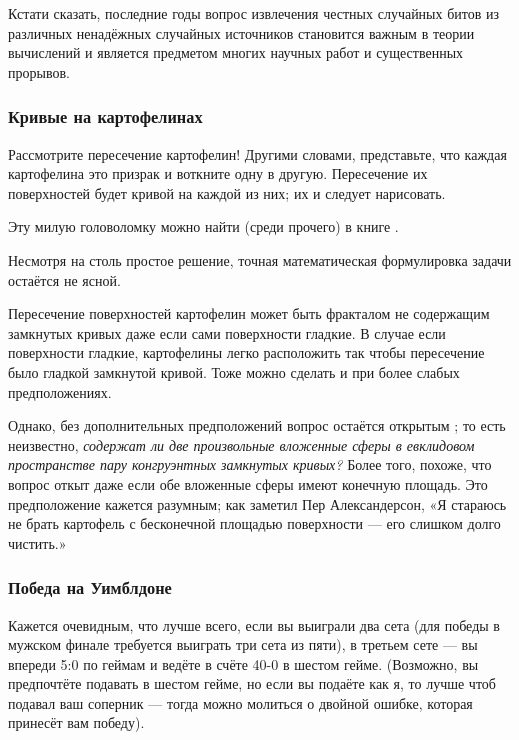 Кстати сказать, последние годы вопрос извлечения честных %
случайных битов из различных ненадёжных случайных источников становится важным в теории вычислений и является предметом многих научных работ и существенных прорывов.

\subsubsection*{Кривые на картофелинах}

Рассмотрите пересечение картофелин!
Другими словами, представьте, что каждая картофелина это призрак и воткните одну в другую.
Пересечение их поверхностей будет кривой на каждой из них; их и следует нарисовать.

Эту милую головоломку можно найти (среди прочего) в книге \cite{berlekamp-rodgers}.

\begin{addedbytheeditors}
Несмотря на столь простое решение, точная математическая формулировка задачи остаётся не ясной.

Пересечение поверхностей картофелин может быть фракталом не содержащим замкнутых кривых даже если сами поверхности гладкие.
В случае если поверхности гладкие, картофелины легко расположить так чтобы пересечение было гладкой замкнутой кривой.
Тоже можно сделать и при более слабых предположениях.

Однако, без дополнительных предположений вопрос остаётся открытым \cite{agol};
то есть неизвестно, \emph{содержат ли две произвольные вложенные сферы в евклидовом пространстве пару конгруэнтных замкнутых кривых?} 
Более того, похоже, что вопрос откыт даже если обе вложенные сферы имеют конечную площадь.
Это предположение кажется разумным; как заметил Пер Александерсон,
«Я стараюсь не брать картофель с бесконечной площадью поверхности --- его слишком долго чистить.»
\end{addedbytheeditors}

\subsubsection*{Победа на Уимблдоне}

Кажется очевидным, что лучше всего, если вы выиграли два сета (для победы в
мужском финале требуется выиграть три сета из пяти), в третьем сете --- вы впереди 5:0 по
геймам и ведёте в счёте 40-0 в шестом гейме.
(Возможно, вы предпочтёте подавать в шестом гейме, но если вы подаёте как я, то лучше чтоб подавал ваш соперник --- тогда можно молиться о двойной ошибке, которая принесёт вам победу).

